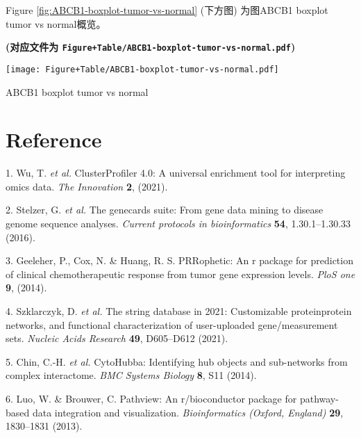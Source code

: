 \documentclass[
]{article}
\newenvironment{cslreferences}%
  {}%
  {\par}
\begin{document}
Figure \ref{fig:ABCB1-boxplot-tumor-vs-normal} (下方图) 为图ABCB1 boxplot tumor vs normal概览。

\textbf{(对应文件为 \texttt{Figure+Table/ABCB1-boxplot-tumor-vs-normal.pdf})}

\def\@captype{figure}
\begin{center}
\texttt{[image: Figure+Table/ABCB1-boxplot-tumor-vs-normal.pdf]}
\caption{ABCB1 boxplot tumor vs normal}\label{fig:ABCB1-boxplot-tumor-vs-normal}
\end{center}

\begin{center}\vspace{1.5cm}\end{center}

\hypertarget{bibliography}{%
\section*{Reference}\label{bibliography}}

\hypertarget{refs}{}
\begin{cslreferences}
\leavevmode\hypertarget{ref-ClusterprofilerWuTi2021}{}%
1. Wu, T. \emph{et al.} ClusterProfiler 4.0: A universal enrichment tool for interpreting omics data. \emph{The Innovation} \textbf{2}, (2021).

\leavevmode\hypertarget{ref-TheGenecardsSStelze2016}{}%
2. Stelzer, G. \emph{et al.} The genecards suite: From gene data mining to disease genome sequence analyses. \emph{Current protocols in bioinformatics} \textbf{54}, 1.30.1--1.30.33 (2016).

\leavevmode\hypertarget{ref-PrropheticAnGeeleh2014}{}%
3. Geeleher, P., Cox, N. \& Huang, R. S. PRRophetic: An r package for prediction of clinical chemotherapeutic response from tumor gene expression levels. \emph{PloS one} \textbf{9}, (2014).

\leavevmode\hypertarget{ref-TheStringDataSzklar2021}{}%
4. Szklarczyk, D. \emph{et al.} The string database in 2021: Customizable proteinprotein networks, and functional characterization of user-uploaded gene/measurement sets. \emph{Nucleic Acids Research} \textbf{49}, D605--D612 (2021).

\leavevmode\hypertarget{ref-CytohubbaIdenChin2014}{}%
5. Chin, C.-H. \emph{et al.} CytoHubba: Identifying hub objects and sub-networks from complex interactome. \emph{BMC Systems Biology} \textbf{8}, S11 (2014).

\leavevmode\hypertarget{ref-PathviewAnRLuoW2013}{}%
6. Luo, W. \& Brouwer, C. Pathview: An r/bioconductor package for pathway-based data integration and visualization. \emph{Bioinformatics (Oxford, England)} \textbf{29}, 1830--1831 (2013).
\end{cslreferences}
\end{document}
